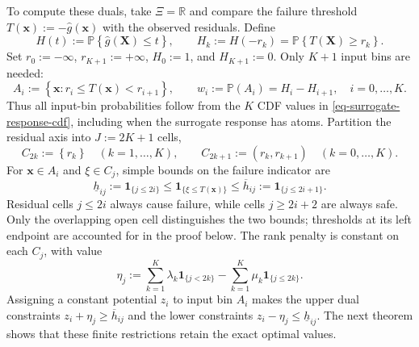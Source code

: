 \documentclass[review,11pt,3p,authoryear,nopreprintline]{elsarticle}
\begin{document}
To compute these duals, take $\Xi=\mathbb R$ and compare the failure threshold $T(\bm x):=-\hat g(\bm x)$ with the observed residuals. Define
\begin{equation}
  H(t):=\mathbb P\left\{\hat g(\bm X)\le t\right\},\qquad
  H_k:=H(-r_k)=\mathbb P\left\{T(\bm X)\ge r_k\right\}.
  \label{eq-surrogate-response-cdf}
\end{equation}
Set $r_0:=-\infty$, $r_{K+1}:=+\infty$, $H_0:=1$, and $H_{K+1}:=0$. Only $K+1$ input bins are needed:
\begin{equation}
  A_i:=\left\{\bm x:r_i\le T(\bm x)<r_{i+1}\right\},\qquad
  w_i:=\mathbb P\left(A_i\right)=H_i-H_{i+1},\quad i=0,\ldots,K.
  \label{eq-input-cells}
\end{equation}
Thus all input-bin probabilities follow from the $K$ CDF values in \eqref{eq-surrogate-response-cdf}, including when the surrogate response has atoms. Partition the residual axis into $J:=2K+1$ cells,
\begin{equation}
  C_{2k}:=\left\{r_k\right\}\quad(k=1,\ldots,K),\qquad
  C_{2k+1}:=\left(r_k,r_{k+1}\right)\quad(k=0,\ldots,K).
  \label{eq-residual-cells}
\end{equation}
For $\bm x\in A_i$ and $\xi\in C_j$, simple bounds on the failure indicator are
\begin{equation}
  \underline h_{ij}:=\mathbf1_{\{j\le2i\}}
  \le\mathbf1_{\{\xi\le T(\bm x)\}}
  \le\overline h_{ij}:=\mathbf1_{\{j\le2i+1\}}.
  \label{eq-cell-costs}
\end{equation}
Residual cells $j\le2i$ always cause failure, while cells $j\ge2i+2$ are always safe. Only the overlapping open cell distinguishes the two bounds; thresholds at its left endpoint are accounted for in the proof below. The rank penalty is constant on each $C_j$, with value
\begin{equation}
  \eta_j:=\sum_{k=1}^K\lambda_k\mathbf1_{\{j<2k\}}
  -\sum_{k=1}^K\mu_k\mathbf1_{\{j\le2k\}}.
  \label{eq-dual-cell-values}
\end{equation}
Assigning a constant potential $z_i$ to input bin $A_i$ makes the upper dual constraints $z_i+\eta_j\ge\overline h_{ij}$ and the lower constraints $z_i-\eta_j\le\underline h_{ij}$. The next theorem shows that these finite restrictions retain the exact optimal values.
\end{document}
